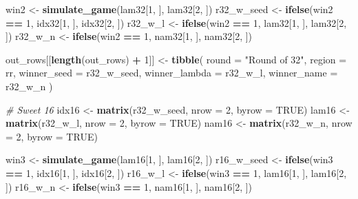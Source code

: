 \documentclass[
]{article}
\newenvironment{Shaded}{\begin{snugshade}}{\end{snugshade}}
\newcommand{\AttributeTok}[1]{\textcolor[rgb]{0.13,0.29,0.53}{#1}}
\newcommand{\CommentTok}[1]{\textcolor[rgb]{0.56,0.35,0.01}{\textit{#1}}}
\newcommand{\ConstantTok}[1]{\textcolor[rgb]{0.56,0.35,0.01}{#1}}
\newcommand{\DecValTok}[1]{\textcolor[rgb]{0.00,0.00,0.81}{#1}}
\newcommand{\FunctionTok}[1]{\textcolor[rgb]{0.13,0.29,0.53}{\textbf{#1}}}
\newcommand{\NormalTok}[1]{#1}
\newcommand{\OtherTok}[1]{\textcolor[rgb]{0.56,0.35,0.01}{#1}}
\newcommand{\SpecialCharTok}[1]{\textcolor[rgb]{0.81,0.36,0.00}{\textbf{#1}}}
\newcommand{\StringTok}[1]{\textcolor[rgb]{0.31,0.60,0.02}{#1}}
\begin{document}
\begin{Shaded}
\begin{Highlighting}[]
\NormalTok{        win2 }\OtherTok{\textless{}{-}} \FunctionTok{simulate\_game}\NormalTok{(lam32[}\DecValTok{1}\NormalTok{, ], lam32[}\DecValTok{2}\NormalTok{, ])}
\NormalTok{        r32\_w\_seed }\OtherTok{\textless{}{-}} \FunctionTok{ifelse}\NormalTok{(win2 }\SpecialCharTok{==} \DecValTok{1}\NormalTok{, idx32[}\DecValTok{1}\NormalTok{, ], idx32[}\DecValTok{2}\NormalTok{, ])}
\NormalTok{        r32\_w\_l }\OtherTok{\textless{}{-}} \FunctionTok{ifelse}\NormalTok{(win2 }\SpecialCharTok{==} \DecValTok{1}\NormalTok{, lam32[}\DecValTok{1}\NormalTok{, ], lam32[}\DecValTok{2}\NormalTok{, ])}
\NormalTok{        r32\_w\_n }\OtherTok{\textless{}{-}} \FunctionTok{ifelse}\NormalTok{(win2 }\SpecialCharTok{==} \DecValTok{1}\NormalTok{, nam32[}\DecValTok{1}\NormalTok{, ], nam32[}\DecValTok{2}\NormalTok{, ])}

\NormalTok{        out\_rows[[}\FunctionTok{length}\NormalTok{(out\_rows) }\SpecialCharTok{+} \DecValTok{1}\NormalTok{]] }\OtherTok{\textless{}{-}} \FunctionTok{tibble}\NormalTok{(}
            \AttributeTok{round =} \StringTok{"Round of 32"}\NormalTok{, }\AttributeTok{region =}\NormalTok{ rr,}
            \AttributeTok{winner\_seed =}\NormalTok{ r32\_w\_seed, }\AttributeTok{winner\_lambda =}\NormalTok{ r32\_w\_l, }\AttributeTok{winner\_name =}\NormalTok{ r32\_w\_n}
\NormalTok{        )}

        \CommentTok{\# Sweet 16}
\NormalTok{        idx16 }\OtherTok{\textless{}{-}} \FunctionTok{matrix}\NormalTok{(r32\_w\_seed, }\AttributeTok{nrow =} \DecValTok{2}\NormalTok{, }\AttributeTok{byrow =} \ConstantTok{TRUE}\NormalTok{)}
\NormalTok{        lam16 }\OtherTok{\textless{}{-}} \FunctionTok{matrix}\NormalTok{(r32\_w\_l, }\AttributeTok{nrow =} \DecValTok{2}\NormalTok{, }\AttributeTok{byrow =} \ConstantTok{TRUE}\NormalTok{)}
\NormalTok{        nam16 }\OtherTok{\textless{}{-}} \FunctionTok{matrix}\NormalTok{(r32\_w\_n, }\AttributeTok{nrow =} \DecValTok{2}\NormalTok{, }\AttributeTok{byrow =} \ConstantTok{TRUE}\NormalTok{)}

\NormalTok{        win3 }\OtherTok{\textless{}{-}} \FunctionTok{simulate\_game}\NormalTok{(lam16[}\DecValTok{1}\NormalTok{, ], lam16[}\DecValTok{2}\NormalTok{, ])}
\NormalTok{        r16\_w\_seed }\OtherTok{\textless{}{-}} \FunctionTok{ifelse}\NormalTok{(win3 }\SpecialCharTok{==} \DecValTok{1}\NormalTok{, idx16[}\DecValTok{1}\NormalTok{, ], idx16[}\DecValTok{2}\NormalTok{, ])}
\NormalTok{        r16\_w\_l }\OtherTok{\textless{}{-}} \FunctionTok{ifelse}\NormalTok{(win3 }\SpecialCharTok{==} \DecValTok{1}\NormalTok{, lam16[}\DecValTok{1}\NormalTok{, ], lam16[}\DecValTok{2}\NormalTok{, ])}
\NormalTok{        r16\_w\_n }\OtherTok{\textless{}{-}} \FunctionTok{ifelse}\NormalTok{(win3 }\SpecialCharTok{==} \DecValTok{1}\NormalTok{, nam16[}\DecValTok{1}\NormalTok{, ], nam16[}\DecValTok{2}\NormalTok{, ])}


\end{Highlighting}
\end{Shaded}
\end{document}

